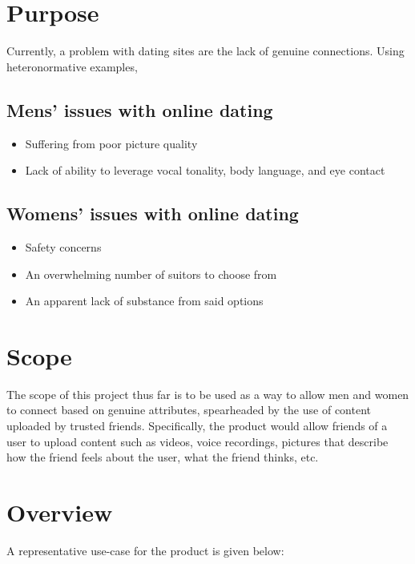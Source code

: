 \section{Purpose}
Currently, a problem with dating sites are the lack of genuine connections. Using heteronormative examples,


\subsection{Mens' issues with online dating}

\begin{itemize}
    \item Suffering from poor picture quality
    \item Lack of ability to leverage vocal tonality, body language, and eye contact
\end{itemize}


\subsection{Womens' issues with online dating}
\begin{itemize}
    \item Safety concerns
    \item An overwhelming number of suitors to choose from
    \item An apparent lack of substance from said options
\end{itemize}


\section{Scope}
The scope of this project thus far is to be used as a way to allow men and women to connect based on genuine attributes,
spearheaded by the use of content uploaded by trusted friends.
Specifically, the product would allow friends of a user to upload content such as videos, voice recordings, pictures that describe
how the friend feels about the user, what the friend thinks, etc. 


\section{Overview}
A representative use-case for the product is given below:


